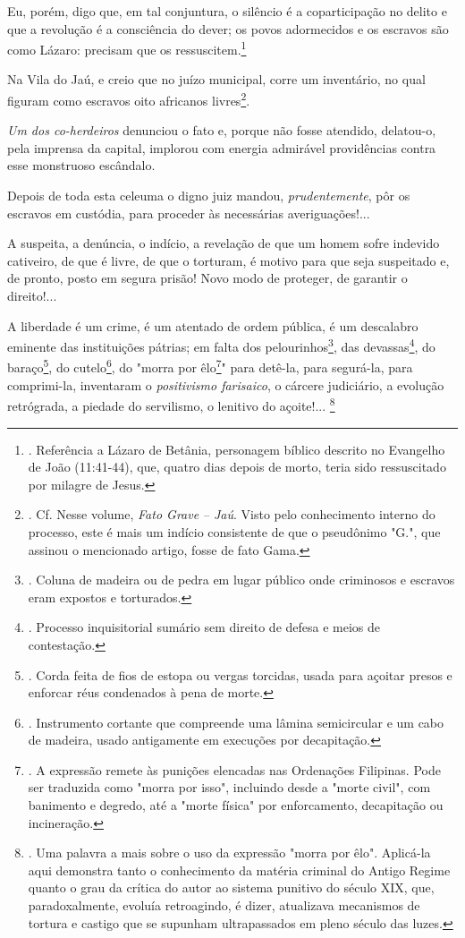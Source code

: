 Eu, porém, digo que, em tal conjuntura, o silêncio é a coparticipação no
delito e que a revolução é a consciência do dever; os povos adormecidos
e os escravos são como Lázaro: precisam que os ressuscitem.\footnote{.
  Referência a Lázaro de Betânia, personagem bíblico descrito no
  Evangelho de João (11:41-44), que, quatro dias depois de morto, teria
  sido ressuscitado por milagre de Jesus.}

Na Vila do Jaú, e creio que no juízo municipal, corre um inventário, no
qual figuram como escravos oito africanos livres\footnote{. Cf. Nesse
  volume, \emph{Fato Grave} \emph{-- Jaú}. Visto pelo conhecimento
  interno do processo, este é mais um indício consistente de que o
  pseudônimo "G.", que assinou o mencionado artigo, fosse de fato Gama.}.

\emph{Um dos co-herdeiros} denunciou o fato e, porque não fosse
atendido, delatou-o, pela imprensa da capital, implorou com energia
admirável providências contra esse monstruoso escândalo.

Depois de toda esta celeuma o digno juiz mandou, \emph{prudentemente},
pôr os escravos em custódia, para proceder às necessárias
averiguações!...

A suspeita, a denúncia, o indício, a revelação de que um homem sofre
indevido cativeiro, de que é livre, de que o torturam, é motivo para que
seja suspeitado e, de pronto, posto em segura prisão! Novo modo de
proteger, de garantir o direito!...

A liberdade é um crime, é um atentado de ordem pública, é um descalabro
eminente das instituições pátrias; em falta dos pelourinhos\footnote{.
  Coluna de madeira ou de pedra em lugar público onde criminosos e
  escravos eram expostos e torturados.}, das devassas\footnote{.
  Processo inquisitorial sumário sem direito de defesa e meios de
  contestação.}, do baraço\footnote{. Corda feita de fios de estopa ou
  vergas torcidas, usada para açoitar presos e enforcar réus condenados
  à pena de morte.}, do cutelo\footnote{. Instrumento cortante que
  compreende uma lâmina semicircular e um cabo de madeira, usado
  antigamente em execuções por decapitação.}, do "morra por
êlo\footnote{. A expressão remete às punições elencadas nas Ordenações
  Filipinas. Pode ser traduzida como "morra por isso", incluindo desde a
  "morte civil", com banimento e degredo, até a "morte física" por
  enforcamento, decapitação ou incineração.}" para detê-la, para
segurá-la, para comprimi-la, inventaram o \emph{positivismo farisaico},
o cárcere judiciário, a evolução retrógrada, a piedade do servilismo, o
lenitivo do açoite!... \footnote{. Uma palavra a mais sobre o uso da
  expressão "morra por êlo". Aplicá-la aqui demonstra tanto o
  conhecimento da matéria criminal do Antigo Regime quanto o grau da
  crítica do autor ao sistema punitivo do século XIX, que,
  paradoxalmente, evoluía retroagindo, é dizer, atualizava mecanismos de
  tortura e castigo que se supunham ultrapassados em pleno século das
  luzes.}

